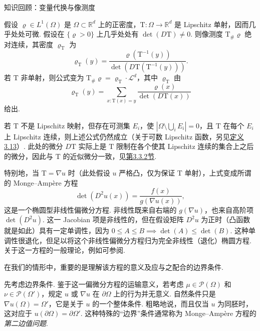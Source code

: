 \begin{sourcebox}{知识回顾：变量代换与像测度}\label{box:1.14}
\begin{proposition*}
假设 $\varrho\in L^1(\Omega)$ 是 $\Omega\subset\mathbb R^d$ 上的正密度，$\mathrm{T}:\Omega\to\mathbb R^d$ 是 Lipschitz 单射，因而几乎处处可微. 假设在 $\{\varrho>0\}$ 上几乎处处有 $\det(D\mathrm{T})\neq0$. 则像测度 $\mathrm{T}_\#\varrho$ 绝对连续，其密度 $\varrho_{\mathrm{T}}$ 为
\[
 \varrho_{\mathrm{T}}(y)=\frac{\varrho(\mathrm{T}^{-1}(y))}{\det(D\mathrm{T}(\mathrm{T}^{-1}(y)))}.
\]
若 $\mathrm{T}$ 非单射，则公式变为 $\mathrm{T}_\#\varrho=\varrho_{\mathrm{T}}\cdot\mathscr L^d$，其中 $\varrho_{\mathrm{T}}$ 由
\[
 \varrho_{\mathrm{T}}(y)=\sum_{x:\mathrm{T}(x)=y}\frac{\varrho(x)}{\det(D\mathrm{T}(x))}
\]
给出.

\label{idx:i30-p54}
若 $\mathrm{T}$ 不是 Lipschitz 映射，但存在可测集 $E_i$，使 $|\Omega\setminus\bigcup_iE_i|=0$，且 $\mathrm{T}$ 在每个 $E_i$ 上 Lipschitz 连续，则上述公式仍然成立（关于可数 Lipschitz 函数，另见\hyperref[obj:3.13]{定义3.13}）. 此处的微分 $D\mathrm{T}$ 实际上是 $\mathrm{T}$ 限制在各个使其 Lipschitz 连续的集合上之后的微分，因此与 $\mathrm{T}$ 的近似微分一致，见\hyperref[sec:3.3.2]{第3.3.2节}.
\end{proposition*}
\end{sourcebox}

特别地，当 $\mathrm{T}=\nabla u$ 时（此处假设 $u$ 严格凸，仅为保证 $\mathrm{T}$ 单射），上式变成所谓的 Monge--Amp\`ere 方程
\begin{equation}\label{eq:1.8}
 \det(D^2u(x))=\frac{f(x)}{g(\nabla u(x))},
\end{equation}
这是一个椭圆型非线性偏微分方程. 非线性既来自右端的 $g(\nabla u)$，也来自高阶项 $\det(D^2u)$. 这一 Jacobian 项是非线性的，但在假设矩阵 $D^2u$ 为正时（凸函数就是如此）具有一定单调性，因为 $0\leq A\leq B\implies\det(A)\leq\det(B)$. 这种单调性很退化，但足以将这个非线性偏微分方程归为完全非线性（退化）椭圆方程. 关于这一方程的一般理论，例如可参阅\cite{b190}.

在我们的情形中，重要的是理解该方程的意义及应与之配合的边界条件.

\label{idx:i136-p55}
先考虑边界条件. 鉴于这一偏微分方程的运输意义，若考虑 $\mu\in\mathscr P(\Omega)$ 和 $\nu\in\mathscr P(\Omega')$，规定 $u$ 或 $\nabla u$ 在 $\partial\Omega$ 上的行为并无意义. 自然条件只是 $\nabla u(\Omega)=\Omega'$，它是关于 $u$ 的一个整体条件. 粗略地说，而且仅当 $u$ 为同胚时，这对应于 $u(\partial\Omega)=\partial\Omega'$. 这种特殊的“边界”条件通常称为 Monge--Amp\`ere 方程的\emph{第二边值问题}.

